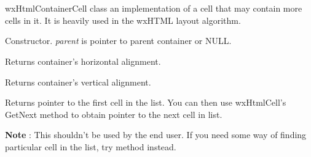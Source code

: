 %
%

\section{}\label{wxhtmlcontainercell}

wxHtmlContainerCell class an implementation of a cell that may
contain more cells in it. It is heavily used in the wxHTML layout algorithm.






\label{wxhtmlcontainercellwxhtmlcontainercell}


Constructor. {\it parent} is pointer to parent container or NULL.


\label{wxhtmlcontainercellgetalignhor}


Returns container's horizontal alignment.

\label{wxhtmlcontainercellgetalignver}


Returns container's vertical alignment.

\label{wxhtmlcontainercellgetfirstcell}


Returns pointer to the first cell in the list.
You can then use wxHtmlCell's GetNext method to obtain pointer to the next
cell in list.

{\bf Note} : This shouldn't be used by the end user. If you need some way of
finding particular cell in the list, try  method
instead.

\label{wxhtmlcontainercellgetindent}


